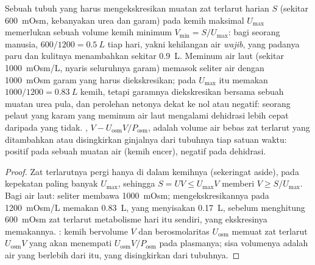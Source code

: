 \begin{proposition}\label{prop:b3:renal-osmoregulation:water}
Sebuah tubuh yang harus mengekskresikan muatan zat terlarut harian $S$ (sekitar
\qty{600}{mOsm}, kebanyakan urea dan garam) pada  kemih maksimal
$U_{\max}$ memerlukan sebuah volume kemih minimum $V_{\min} = S/U_{\max}$: bagi
seorang manusia, $600/1200 = \qty{0.5}{L}$ tiap hari, yakni kehilangan air
\emph{wajib}, yang padanya paru dan kulitnya menambahkan sekitar \qty{0.9}{L}. Meminum
air laut (sekitar \qty{1000}{mOsm/L}, nyaris seluruhnya garam) memasok seliter
air dengan \qty{1000}{mOsm} garam yang harus diekskresikan; pada
$U_{\max}$ itu memakan $1000/1200 = \qty{0.83}{L}$ kemih, tetapi
garamnya diekskresikan bersama sebuah muatan urea pula, dan perolehan netonya dekat
ke nol atau negatif: seorang pelaut yang karam yang meminum air laut
mengalami dehidrasi lebih cepat daripada yang tidak. \emph{}, $V - U_{\text{osm}}V/P_{\text{osm}}$, adalah volume
air bebas zat terlarut yang ditambahkan atau disingkirkan ginjalnya dari tubuhnya tiap satuan
waktu: positif pada sebuah muatan air (kemih encer), negatif pada
dehidrasi.
\end{proposition}
\begin{proof}
Zat terlarutnya pergi hanya di dalam kemihnya (sekeringat aside), pada kepekatan paling banyak
$U_{\max}$, sehingga $S = U V \le U_{\max}V$ memberi $V \ge S/U_{\max}$. Bagi air
laut: seliter membawa \qty{1000}{mOsm}; mengekskresikannya pada
\qty{1200}{mOsm/L} memakan \qty{0.83}{L}, yang menyisakan \qty{0.17}{L}, sebelum
menghitung \qty{600}{mOsm} zat terlarut metabolisme hari itu sendiri, yang
ekskresinya memakannya. : kemih bervolume $V$
dan berosmolaritas $U_{\text{osm}}$ memuat zat terlarut $U_{\text{osm}}V$ yang
akan menempati $U_{\text{osm}}V/P_{\text{osm}}$ pada  plasmanya;
sisa volumenya adalah air yang berlebih dari itu, yang disingkirkan dari tubuhnya.
\end{proof}

